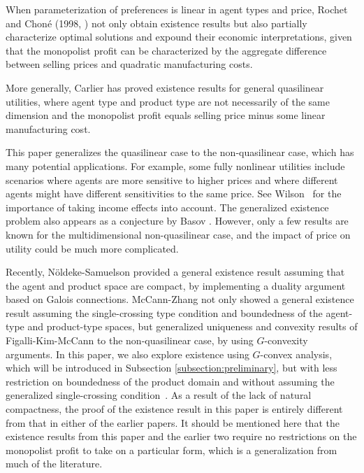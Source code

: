 \documentclass[a4paper, 11pt]{amsart}
\numberwithin{equation}{section}
\theoremstyle{plain}
\theoremstyle{definition}
\theoremstyle{remark}
\begin{document}
When parameterization of preferences is linear in agent types and price, Rochet and Chon\'e (1998, \cite{RochetChone98}) not only obtain existence results but also partially characterize optimal solutions and expound their economic interpretations, %
given that the monopolist profit can be characterized by {the aggregate difference between selling prices and quadratic manufacturing costs.}\medskip

More generally, Carlier \cite{Carlier01} has proved existence results for general quasilinear utilities, where agent type and product type are not necessarily of the same dimension and the monopolist profit equals selling price minus some linear manufacturing cost.\medskip

This paper generalizes the quasilinear case to the non-quasilinear case, which has many potential applications. For example, some fully nonlinear utilities include scenarios where agents are more sensitive to higher prices and where different agents might have different sensitivities to the same price. %
See Wilson~\cite[Chapter 7]{Wilson93} for the importance of taking income effects into account. 
The generalized existence problem also appears as a conjecture by Basov \cite[Chapter~8]{Basov05}. However, only a few results are known for the multidimensional non-quasilinear case, and the impact of price on utility could be much more complicated.\medskip


Recently, N\"oldeke-Samuelson \cite{NoldekeSamuelson15p} provided a general existence result assuming that the agent and product space are compact, by implementing a duality argument based on Galois connections. McCann-Zhang \cite{McCannZhang17} not only showed a general existence result assuming the single-crossing type condition and
boundedness of the agent-type and product-type spaces, %
but generalized uniqueness and convexity results of Figalli-Kim-McCann \cite{FigalliKimMcCann11} to the non-quasilinear case, by using $G$-convexity arguments. In this paper, we also explore existence using $G$-convex analysis, which will be introduced in Subsection \ref{subsection:preliminary}, but with less restriction on boundedness of the product domain and without assuming the generalized single-crossing condition~\cite{McAfeeMcMillan88}. As a result of the lack of natural compactness, the proof of the existence result in this paper is entirely different from that in either of the %
earlier papers. It should be mentioned here that the existence results from this paper and the earlier two require no restrictions on the monopolist profit to take on a particular %
form, which is a generalization from much of the literature.\medskip
\end{document}
